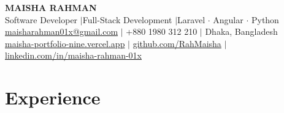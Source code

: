 \documentclass[letterpaper,10pt]{article}
\newcommand{\cvsection}[1]{\needspace{5\baselineskip}\section{#1}}
\newcommand{\sep}{{\color{midgray}\;$|$\;}}
\begin{document}
\begin{center}
  {\LARGE\bfseries\color{navy} MAISHA RAHMAN}\\[3pt]
  {\small Software Developer \sep Full-Stack Development \sep Laravel $\cdot$ Angular $\cdot$ Python}\\[4pt]
  {\small
    \href{mailto:maisharahman01x@gmail.com}{maisharahman01x@gmail.com} \sep
    +880 1980 312 210 \sep
    Dhaka, Bangladesh
  }\\[2pt]
  {\small
    \href{https://maisha-portfolio-nine.vercel.app}{maisha-portfolio-nine.vercel.app} \sep
    \href{https://github.com/RahMaisha}{github.com/RahMaisha} \sep
    \href{https://linkedin.com/in/maisha-rahman-01x}{linkedin.com/in/maisha-rahman-01x}
  }
\end{center}
\vspace{1pt}

\cvsection{Experience}
\end{document}
